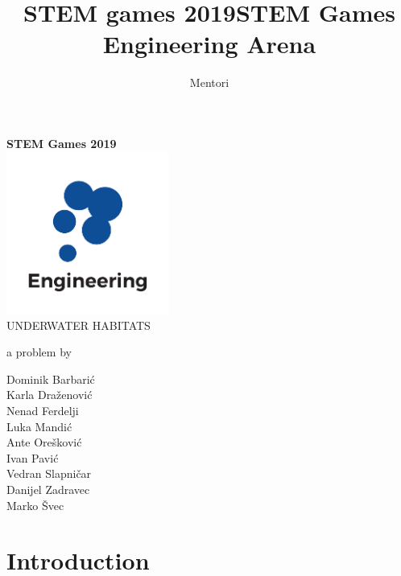 \documentclass{article}
\title{STEM games 2019}
\author{Mentori}
\title{STEM Games Engineering Arena}
\date{}
\begin{document}
	
	\thispagestyle{empty}
	\newpage
	\thispagestyle{empty}
	\vspace*{0cm}
	\begin{center}
		
		\textbf{\Huge{STEM Games 2019}}\\
		\vspace*{2.4cm}
		\includegraphics[width=0.4\textwidth]{logos/engineering} \\
		\vspace*{2.4cm}
		\huge{UNDERWATER HABITATS}
		
		\medskip
		
		\normalsize{a problem by}
		
		\medskip
		
		Dominik Barbarić \\
		Karla Draženović \\
		Nenad Ferdelji \\
		Luka Mandić \\
		Ante Orešković \\
		Ivan Pavić \\
		Vedran Slapničar \\
		Danijel Zadravec \\
		Marko Švec 
		
		\vspace{6cm}
		
		
		\normalsize{}
	\end{center}
	
	\newpage
	
\section{Introduction}

	
	
\end{document}
